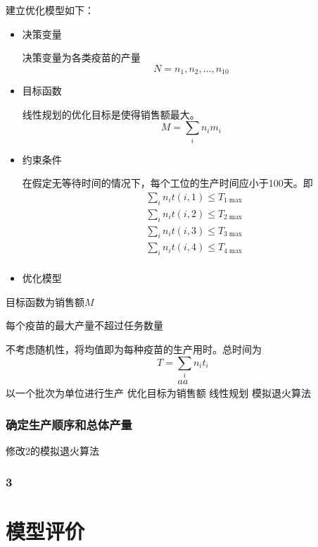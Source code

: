 \documentclass[UTF8]{ctexart}
\begin{document}
	建立优化模型如下：
	\begin{itemize}
	\item 决策变量
	\par 决策变量为各类疫苗的产量
	\begin{equation}
		N={n_{1},n_{2},\dots,n_{10}}
	\end{equation}
	\item 目标函数
	\par 线性规划的优化目标是使得销售额最大。
	\begin{equation}
		M=\sum_{i}n_{i}m_{i}
	\end{equation}
	\item 约束条件
	\par 在假定无等待时间的情况下，每个工位的生产时间应小于100天。即
	\begin{equation}
	\begin{split}
		&\sum_{i}n_{i}t(i,1)\leqslant T_{1\max}\\
		&\sum_{i}n_{i}t(i,2)\leqslant T_{2\max}\\
		&\sum_{i}n_{i}t(i,3)\leqslant T_{3\max}\\
		&\sum_{i}n_{i}t(i,4)\leqslant T_{4\max}\\
	\end{split}
	\end{equation}
	\item 优化模型
	\end{itemize}
	目标函数为销售额$M$
	
	每个疫苗的最大产量不超过任务数量

	不考虑随机性，将均值即为每种疫苗的生产用时。总时间为
	\begin{equation}
	T=\sum_{i}n_{i}t_{i}
	\end{equation}
	\begin{equation}
	\begin{split}
	aa
	\end{split}
	\end{equation}
	以一个批次为单位进行生产
	优化目标为销售额
	线性规划
	模拟退火算法
	\subsubsection{确定生产顺序和总体产量}
	修改2的模拟退火算法
	\subsubsection{3}
	
	\section{模型评价}
\end{document}
